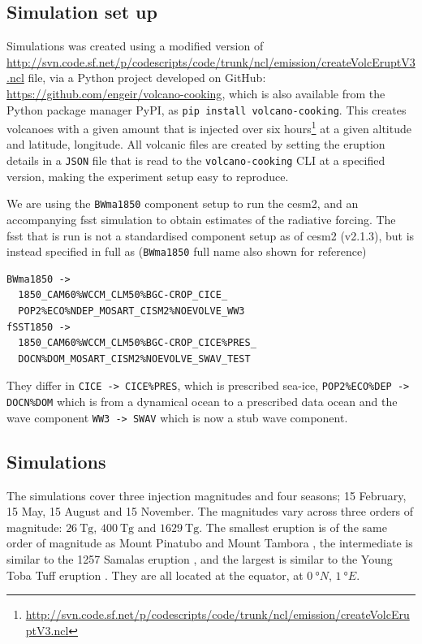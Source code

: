 \documentclass[twocol]{ametsocV5}
\begin{document}
\subsection{Simulation set up}

Simulations was created using a modified version of
\url{http://svn.code.sf.net/p/codescripts/code/trunk/ncl/emission/createVolcEruptV3.ncl}
file, via a Python project developed on GitHub:
\url{https://github.com/engeir/volcano-cooking}, which is also available from the Python
package manager PyPI, as \texttt{pip install volcano-cooking}. This creates volcanoes
with a given  amount that is injected over six
hours\footnote{\url{http://svn.code.sf.net/p/codescripts/code/trunk/ncl/emission/createVolcEruptV3.ncl}}
at a given altitude and latitude, longitude. All volcanic  files are created by
setting the eruption details in a \texttt{JSON} file that is read to the
\texttt{volcano-cooking} CLI at a specified version, making the experiment setup easy to
reproduce.

We are using the \texttt{BWma1850} component setup to run the \acrshort{cesm2}, and an
accompanying \acrfull{fsst} simulation to obtain estimates of the radiative forcing. The
\acrshort{fsst} that is run is not a standardised component setup as of \acrshort{cesm2}
(v2.1.3), but is instead specified in full as (\texttt{BWma1850} full name also shown
for reference)
\begin{small}
  \begin{verbatim}
BWma1850 ->
  1850_CAM60%WCCM_CLM50%BGC-CROP_CICE_
  POP2%ECO%NDEP_MOSART_CISM2%NOEVOLVE_WW3
fSST1850 ->
  1850_CAM60%WCCM_CLM50%BGC-CROP_CICE%PRES_
  DOCN%DOM_MOSART_CISM2%NOEVOLVE_SWAV_TEST
  \end{verbatim}
\end{small}
They differ in \texttt{CICE -> CICE\%PRES}, which is prescribed sea-ice,
\texttt{POP2\%ECO\%DEP -> DOCN\%DOM} which is from a dynamical ocean to a prescribed
data ocean and the wave component \texttt{WW3 -> SWAV} which is now a stub wave
component.

\subsection{Simulations}

The simulations cover three  injection magnitudes and four seasons; 15 February,
15 May, 15 August and 15 November. The magnitudes vary across three orders of magnitude:
\(\SI{26}{\tera\gram}\), \(\SI{400}{\tera\gram}\) and \(\SI{1629}{\tera\gram}\). The
smallest eruption is of the same order of magnitude as Mount Pinatubo
\citep[\(\sim10\)--\(\SI{20}{\tera\gram}\);~e.g.,][]{timmreck2018} and Mount Tambora
\citep[\(\sim\SI{56.2}{\tera\gram}\);~e.g.,][]{zanchettin2016}, the intermediate is
similar to the 1257 Samalas eruption
\citep[\(\sim\SI{119}{\tera\gram}\);][]{toohey2017}, and the largest is similar to the
Young Toba Tuff eruption
\citep[\(10\)--\(\SI{10000}{\tera\gram}\);][and~references~therein]{jones2005}. They are
all located at the equator, at \(\SI{0}{\degree N}\), \(\SI{1}{\degree E}\).
\end{document}
